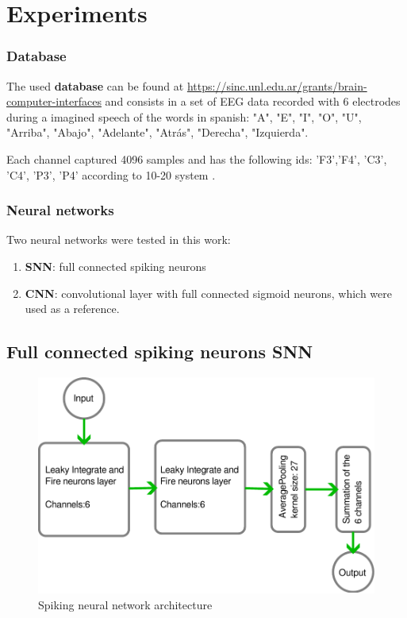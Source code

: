 \section{Experiments}
	\label{sec:experiments}
	
	\subsubsection{Database}
		\par The used  \textbf{database} \cite{PRG16} can be found at \href{https://sinc.unl.edu.ar/grants/brain-computer-interfaces/}{https://sinc.unl.edu.ar/grants/brain-computer-interfaces} and consists in a set of EEG data recorded with 6 electrodes during a imagined speech of the words in spanish: 
		"A", "E", "I", "O", "U", "Arriba", "Abajo", "Adelante", "Atrás", "Derecha", "Izquierda".\newline
		
		\par Each channel captured 4096 samples and has the following ids: 'F3','F4', 'C3', 'C4', 'P3', 'P4' according to 10-20 system \cite{ScienceOpenVid:5960cfa8-7fde-441c-8592-35fdb9841499}.
	
	\subsubsection{Neural networks}
		\par Two neural networks were tested in this work:
		\begin{enumerate}
			\item \label{itm:snn} \textbf{SNN}: full connected spiking neurons
			\item \label{itm:cnn} \textbf{CNN}: convolutional layer with full connected sigmoid neurons, which were used as a reference.
		\end{enumerate}
	
		\subsection{Full connected spiking neurons SNN}
		\begin{figure}[H]
			\centering
			\includegraphics[width=.9\linewidth]{images/architectureSNN}
			\caption{Spiking neural network architecture}
			\label{fig:architecturesnn}
		\end{figure}
	

